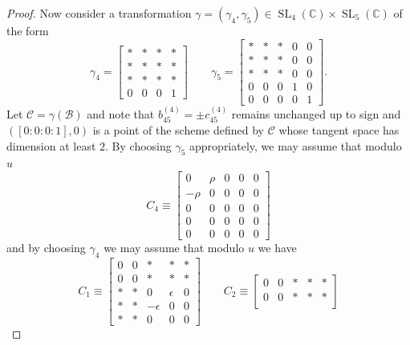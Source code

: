 \documentclass[11pt]{amsart}
\numberwithin{theorem}{section}
\numberwithin{equation}{section}
\theoremstyle{definition}\newtheorem{defn}[theorem]{Definition}
\theoremstyle{definition}\newtheorem{remark}[theorem]{Remark}
\theoremstyle{definition}\newtheorem{question}[theorem]{Question}
\theoremstyle{definition}\newtheorem{problem}[theorem]{Problem}
\newcommand{\CC}{\mathbb{C}}
\DeclareMathOperator{\SL}{SL}
\begin{document}
\begin{proof}
Now consider a transformation $\gamma = (\gamma_4, \gamma_5) \in \SL_4(\CC) \times \SL_5(\CC)$ of the form
\begin{equation*}
    \gamma_4 = \begin{bmatrix}
      * & * & * & * \\
      * & * & * & * \\
      * & * & * & * \\
      0 & 0 & 0 & 1 
    \end{bmatrix}  
    \qquad
    \gamma_5 = \begin{bmatrix}
        * & * & * & 0 & 0 \\
        * & * & * & 0 & 0 \\
        * & * & * & 0 & 0 \\
        0 & 0 & 0 & 1 & 0 \\
        0 & 0 & 0 & 0 & 1 
    \end{bmatrix}.
\end{equation*}
Let $\mathcal{C} = \gamma(\mathcal{B})$ and note that $b_{45}^{(4)} = \pm c_{45}^{(4)}$ remains unchanged up to sign and $([0:0:0:1], 0)$ is a point of the scheme defined by $\mathcal{C}$ whose tangent space has dimension at least $2$. By choosing $\gamma_5$ appropriately, we may assume that modulo $u$ 
\begin{equation*}    
    C_4 \equiv 
    \begin{bmatrix}
      0 & \rho & 0 & 0 & 0 \\
      -\rho & 0 & 0 & 0 & 0 \\
      0 & 0 & 0 & 0 & 0 \\
      0 & 0 & 0 & 0 & 0 \\
      0 & 0 & 0 & 0 & 0 
    \end{bmatrix}
\end{equation*}
and by choosing $\gamma_4$ we may assume that modulo $u$ we have
\begin{equation*}
  C_1 \equiv \begin{bmatrix}
      0 & 0 & * & * & * \\
      0 & 0 & * & * & * \\
      * & * & 0 & \epsilon & 0 \\
      * & * & -\epsilon & 0 & 0 \\
      * & * & 0 & 0 & 0 
  \end{bmatrix}
  \qquad 
  C_2 \equiv \begin{bmatrix}
      0 & 0 & * & * & * \\
      0 & 0 & * & * & * \\

\end{bmatrix}
\end{equation*}
\end{proof}
\end{document}
